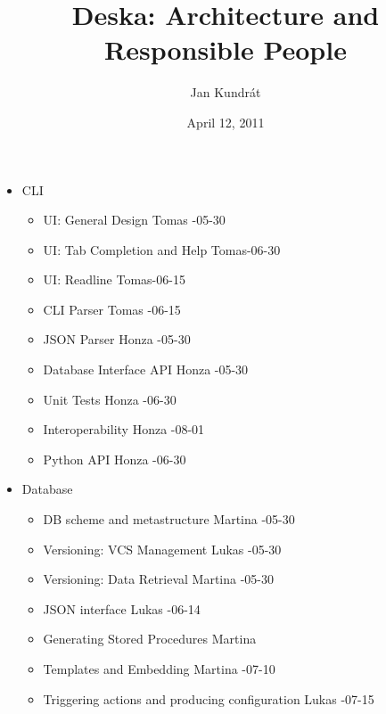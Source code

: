 \documentclass{article}
\begin{document}
\title{Deska: Architecture and Responsible People}

\author{Jan Kundrát}

\date{April 12, 2011}

\maketitle

\TabPositions{12cm,14cm}

\begin{itemize}
    \item CLI
        \begin{itemize}
            \item UI: General Design \tab Tomas -05-30
            \item UI: Tab Completion and Help \tab Tomas-06-30
            \item UI: Readline \tab Tomas-06-15
            \item CLI Parser \tab Tomas -06-15
            \item JSON Parser \tab Honza -05-30
            \item Database Interface API \tab Honza -05-30
            \item Unit Tests \tab Honza -06-30
            \item Interoperability \tab Honza -08-01
            \item Python API \tab Honza -06-30
        \end{itemize}
    \item Database
        \begin{itemize}
            \item DB scheme and metastructure \tab Martina -05-30
            \item Versioning: VCS Management \tab Lukas -05-30
            \item Versioning: Data Retrieval \tab Martina -05-30
            \item JSON interface \tab Lukas -06-14
            \item Generating Stored Procedures \tab Martina
            \item Templates and Embedding \tab Martina -07-10
            \item Triggering actions and producing configuration \tab Lukas -07-15
        \end{itemize}

\end{itemize}
\end{document}
